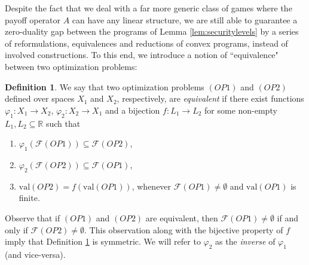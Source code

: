 \documentclass[11pt, twoside]{article}
\numberwithin{equation}{section}
\theoremstyle{definition}
\newtheorem{definition}{Definition}[section]
\begin{document}
Despite the fact that we deal with a far more generic class of games where the payoff operator $A$ can have any linear structure, we are still able to guarantee a zero-duality gap between the programs of Lemma \ref{lem:securitylevels} by a series of reformulations, equivalences and reductions of convex programs, instead of involved constructions. To this end, we introduce a notion of ``equivalence" between two optimization problems:

\begin{definition}\label{def:equivalence}
    We say that two optimization problems $(OP1)$ and $(OP2)$ defined over spaces $X_1$ and $X_2$, respectively, are \textit{equivalent} if there exist functions $\varphi_1:X_1\to X_2$, $\varphi_2:X_2\to X_1$ and a bijection $f:L_1\to L_2$ for some non-empty $L_1,L_2\subseteq\mathbb{R}$ such that \vspace{-0.3cm}
    \begin{enumerate}[(1)]
        \item $\varphi_1\left(\mathcal{F}(OP1)\right)\subseteq\mathcal{F}(OP2)$,\vspace{-0.2cm}
        \item $\varphi_2\left(\mathcal{F}(OP2)\right)\subseteq\mathcal{F}(OP1)$, \vspace{-0.2cm}
        \item $\text{val}(OP2)=f\left(\text{val}(OP1)\right)$, whenever $\mathcal{F}(OP1)\neq\emptyset$ and $\text{val}(OP1)$ is finite.
    \end{enumerate}
\end{definition}

Observe that if $(OP1)$ and $(OP2)$ are equivalent, then $\mathcal{F}(OP1)\neq\emptyset$ if and only if $\mathcal{F}(OP2)\neq\emptyset$. This observation along with the bijective property of $f$ imply that Definition \ref{def:equivalence} is symmetric. We will refer to $\varphi_2$ as the \textit{inverse} of $\varphi_1$ (and vice-versa).\par
\end{document}
